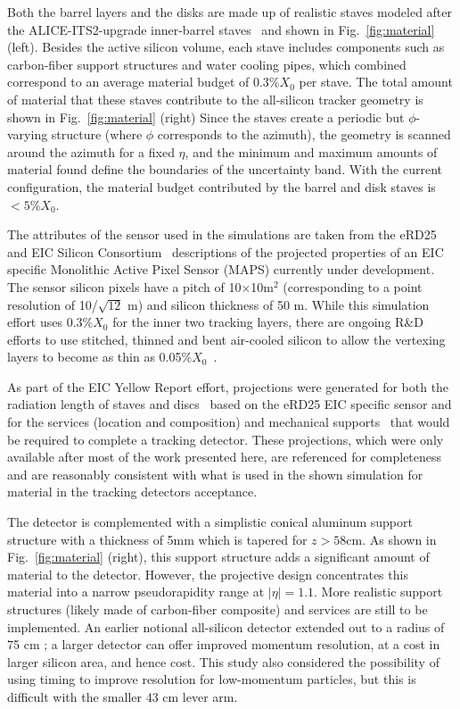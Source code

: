 Both the barrel layers and the disks are made up of realistic staves modeled after the ALICE-ITS2-upgrade inner-barrel staves~\cite{Abelevetal:2014dna,Keil:2015vta,Reidt:2016ysg}
and shown in Fig.~\ref{fig:material} (left).
Besides the active silicon volume, each stave includes components such as carbon-fiber support structures and water cooling pipes, which combined correspond to an average material budget of 0.3$\% X_0$ per stave.
The total amount of material that these staves contribute to the all-silicon tracker geometry is shown in Fig.~\ref{fig:material} (right)
Since the staves create a periodic but $\phi$-varying structure (where $\phi$ corresponds to the azimuth), the geometry is scanned around the azimuth for a fixed $\eta$, and the minimum and maximum amounts of material found define the boundaries of the uncertainty band.
With the current configuration, the material budget contributed by the barrel and disk staves is $<5\%X_0$.

The attributes of the sensor used in the simulations are taken from the eRD25 and EIC Silicon Consortium~\cite{eRD25} descriptions of the projected properties of an EIC specific Monolithic Active Pixel Sensor (MAPS) currently under development.
The sensor silicon pixels have a pitch of 10$\times$10\textmu m$^2$ (corresponding to a point resolution of 10/$\sqrt{12}$ \textmu m) and silicon thickness of 50 \textmu m. While this simulation effort uses 0.3$\% X_0$ for the inner two tracking layers, there are ongoing R\&D efforts to use stitched, thinned and bent air-cooled silicon to allow the vertexing layers to become as thin as 0.05$\% X_0$~\cite{its3det}. 

As part of the EIC Yellow Report effort, projections were generated for both the radiation length of staves and discs~\cite{leo} based on the eRD25 EIC specific sensor and for the services (location and composition) and mechanical supports~\cite{leo2} that would be required to complete a tracking detector. These projections, which were only available after most of the work presented here, are referenced for completeness and are reasonably consistent with what is used in the shown simulation for material in the tracking detectors acceptance.

The detector is complemented with a simplistic conical aluminum support structure with a thickness of 5mm which is tapered for $z>58$cm. As shown in Fig.~\ref{fig:material} (right), this support structure adds a significant amount of material 
to the detector. However, the projective design concentrates this material into a narrow pseudorapidity range at $|\eta|=1.1$.
More realistic support structures (likely made of carbon-fiber composite) and services are still to be implemented.  
An earlier notional all-silicon detector extended out to a radius of 75 cm \cite{Klein:2020sts}; a larger detector can offer improved momentum resolution, at a cost in larger silicon area, and hence cost.  This study also considered the possibility of using timing to improve resolution for low-momentum particles, but this is difficult with the smaller 43 cm lever arm.

